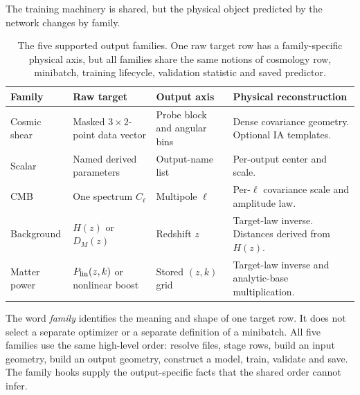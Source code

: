 \documentclass[10pt,aps,prd,twocolumn,nofootinbib]{revtex4-2}
\begin{document}
The training machinery is shared, but the physical object predicted by the
network changes by family.

\begin{table}[t]
\centering
\begin{tabular}{p{}p{}p{}p{}}
\toprule
Family & Raw target & Output axis & Physical reconstruction \\
\midrule
Cosmic shear & Masked $3\times2$-point data vector & Probe block and angular
bins & Dense covariance geometry.  Optional IA templates.  \\
Scalar & Named derived parameters & Output-name list & Per-output center and
scale.  \\
CMB & One spectrum $C_\ell$ & Multipole $\ell$ & Per-$\ell$ covariance scale
and amplitude law.  \\
Background & $H(z)$ or $D_M(z)$ & Redshift $z$ & Target-law inverse.  Distances
derived from $H(z)$.  \\
Matter power & $P_{\rm lin}(z,k)$ or nonlinear boost & Stored $(z,k)$ grid &
Target-law inverse and analytic-base multiplication.  \\
\bottomrule
\end{tabular}
\caption{The five supported output families.  One raw target row has a
family-specific physical axis, but all families share the same notions of
cosmology row, minibatch, training lifecycle, validation statistic and saved
predictor.}
\label{tab:output-families}
\end{table}

The word \emph{family} identifies the meaning and shape of one target row.  It
does not select a separate optimizer or a separate definition of a minibatch.
All five families use the same high-level order: resolve files, stage rows,
build an input geometry, build an output geometry, construct a model, train,
validate and save.  The family hooks supply the output-specific facts that
the shared order cannot infer.
\end{document}
